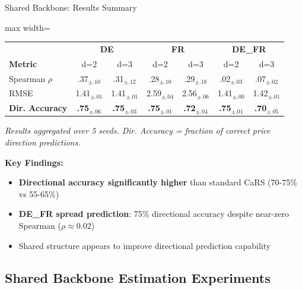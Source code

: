 \documentclass[aspectratio=169]{beamer}
\begin{document}
\begin{frame}{Shared Backbone: Results Summary}
\begin{table}
\centering
\small
\begin{adjustbox}{max width=\textwidth}
\begin{tabular}{l|cc|cc|cc}
\toprule
& \multicolumn{2}{c|}{\textbf{DE}} & \multicolumn{2}{c|}{\textbf{FR}} & \multicolumn{2}{c}{\textbf{DE\_FR}} \\
\textbf{Metric} & d=2 & d=3 & d=2 & d=3 & d=2 & d=3 \\
\midrule
Spearman $\rho$ & .37$_{\pm.10}$ & .31$_{\pm.12}$ & .28$_{\pm.10}$ & .29$_{\pm.18}$ & .02$_{\pm.03}$ & .07$_{\pm.02}$ \\
RMSE & 1.41$_{\pm.01}$ & 1.41$_{\pm.01}$ & 2.59$_{\pm.04}$ & 2.56$_{\pm.06}$ & 1.41$_{\pm.00}$ & 1.42$_{\pm.01}$ \\
\textbf{Dir. Accuracy} & \textbf{.75}$_{\pm.06}$ & \textbf{.75}$_{\pm.03}$ & \textbf{.75}$_{\pm.01}$ & \textbf{.72}$_{\pm.04}$ & \textbf{.75}$_{\pm.01}$ & \textbf{.70}$_{\pm.05}$ \\
\bottomrule
\end{tabular}
\end{adjustbox}
\end{table}

{\scriptsize \textit{Results aggregated over 5 seeds. Dir. Accuracy = fraction of correct price direction predictions.}}

\vspace{0.3cm}
\textbf{Key Findings:}
\begin{itemize}
    \item \textbf{Directional accuracy significantly higher} than standard CaRS (70-75\% vs 55-65\%)
    \item \textbf{DE\_FR spread prediction}: 75\% directional accuracy despite near-zero Spearman ($\rho \approx 0.02$)
    \item Shared structure appears to improve directional prediction capability
\end{itemize}
\end{frame}

\subsection{Shared Backbone Estimation Experiments}
\end{document}
